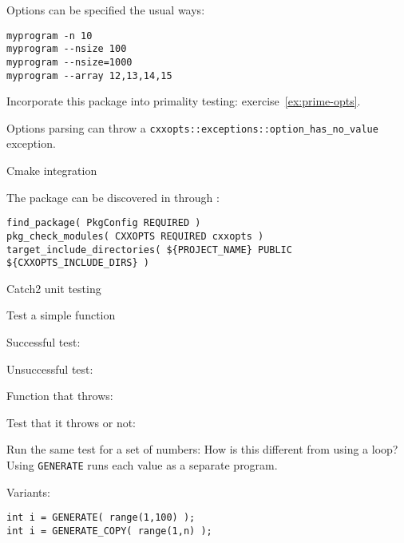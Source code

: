Options can be specified the usual ways:
\begin{verbatim}
myprogram -n 10
myprogram --nsize 100
myprogram --nsize=1000
myprogram --array 12,13,14,15
\end{verbatim}

\begin{exercise}
  Incorporate this package into primality testing:
  exercise~\ref{ex:prime-opts}.
\end{exercise}

Options parsing can throw a
\lstinline{cxxopts::exceptions::option_has_no_value}
exception.

 {Cmake integration}

The  package can be discovered in 
through :
\begingroup\lstset{language=Bash}
\begin{lstlisting}
find_package( PkgConfig REQUIRED )
pkg_check_modules( CXXOPTS REQUIRED cxxopts )
target_include_directories( ${PROJECT_NAME} PUBLIC ${CXXOPTS_INCLUDE_DIRS} )
\end{lstlisting}
\endgroup

 {Catch2 unit testing}
\label{sec:catch2}

Test a simple function

Successful test:

Unsuccessful test:

Function that throws:

Test that it throws or not:

Run the same test for a set of numbers:
How is this different from using a loop?
Using \lstinline{GENERATE} runs each value as a separate program.

Variants:
\begin{lstlisting}
int i = GENERATE( range(1,100) );
int i = GENERATE_COPY( range(1,n) );
\end{lstlisting}
